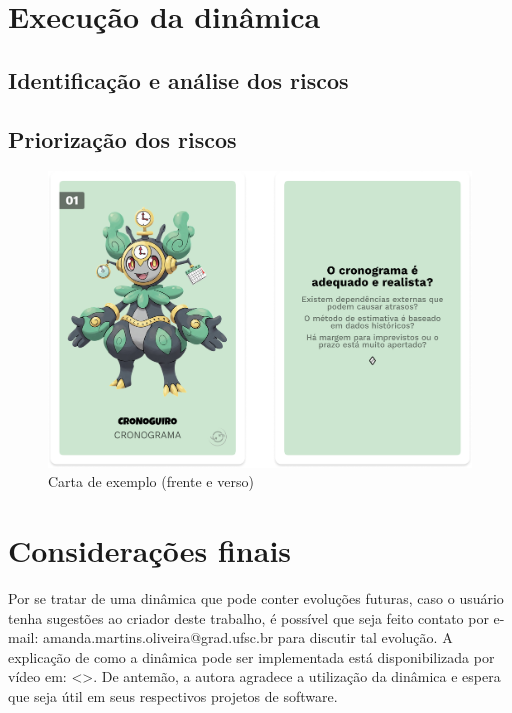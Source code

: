 \documentclass[
	12pt,
	openright,
	twoside,
	a4paper,
	english,
	brazil
	]{abntex2}
\begin{document}
\section{Execução da dinâmica}
\subsection{Identificação e análise dos riscos}
\subsection{Priorização dos riscos}

\begin{figure}[H]
	\caption{\label{carta-exemplo-tarot} Carta de exemplo (frente e verso)}
  \includegraphics[width=\textwidth]{carta-exemplo-tarot}
\end{figure}


\section{Considerações finais}


Por se tratar de uma dinâmica que pode conter evoluções futuras, caso o usuário tenha sugestões ao criador deste trabalho, é possível que seja feito contato por e-mail: amanda.martins.oliveira@grad.ufsc.br para discutir tal evolução. A explicação de como a dinâmica pode
ser implementada está disponibilizada por vídeo em: <>.
De antemão, a autora agradece a utilização da dinâmica e espera que seja útil em seus respectivos projetos de software.
\end{document}
